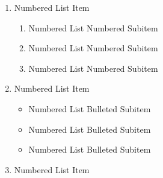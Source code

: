 \begin{enumerate}
\item{Numbered List Item}
\begin{enumerate}
\item{Numbered List Numbered Subitem}
\item{Numbered List Numbered Subitem}
\item{Numbered List Numbered Subitem}
\end{enumerate}
\item{Numbered List Item}
\begin{itemize}
\item{Numbered List Bulleted Subitem}
\item{Numbered List Bulleted Subitem}
\item{Numbered List Bulleted Subitem}
\end{itemize}
\item{Numbered List Item}
\end{enumerate}

